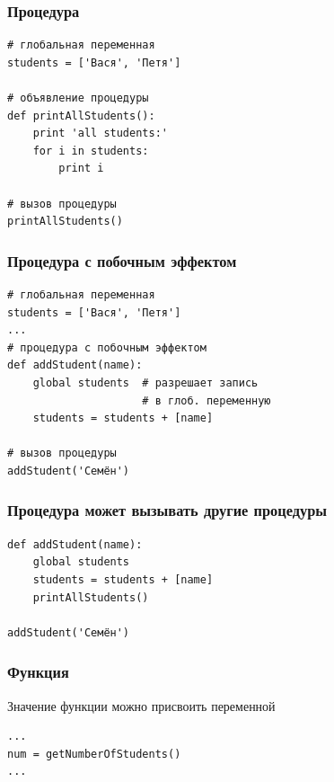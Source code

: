 {  

\begin{frame}[fragile]
  \frametitle{Процедура}
  \begin{verbatim}
# глобальная переменная
students = ['Вася', 'Петя']

# объявление процедуры
def printAllStudents():
    print 'all students:'
    for i in students:
        print i

# вызов процедуры
printAllStudents()
  \end{verbatim}
\end{frame}

\begin{frame}[fragile]
  \frametitle{Процедура с побочным эффектом}
  \begin{verbatim}
# глобальная переменная
students = ['Вася', 'Петя']
...
# процедура с побочным эффектом
def addStudent(name):
    global students  # разрешает запись
                     # в глоб. переменную
    students = students + [name]

# вызов процедуры
addStudent('Семён')
  \end{verbatim}
\end{frame}

\begin{frame}[fragile]
  \frametitle{Процедура может вызывать другие процедуры}
  \begin{verbatim}
def addStudent(name):
    global students
    students = students + [name]
    printAllStudents()

addStudent('Семён')
  \end{verbatim}
\end{frame}

\begin{frame}[fragile]
  \frametitle{Функция}
  Значение функции можно присвоить переменной

  \vspace{1cm}
  \begin{verbatim}
...
num = getNumberOfStudents()
...
  \end{verbatim}
\end{frame}

}
